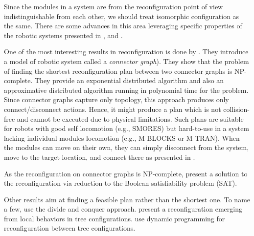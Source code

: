 Since the modules in a system are from the reconfiguration point of view
indistinguishable from each other, we should treat isomorphic configuration as
the same. There are some advances in this area leveraging specific properties of
the robotic systems presented in \textcite{DBLP:journals/ijrr/ParkCTY08},
\textcite{DBLP:conf/iros/AsadpourASI09} and
\textcite{DBLP:journals/ras/TaheriMAP16}.

One of the most interesting results in reconfiguration is done by
\textcite{DBLP:journals/ras/HouS14}. They introduce a model of robotic system
called a \emph{connector graph}). They show that the problem of finding the
shortest reconfiguration plan between two connector graphs is NP-complete. They
provide an exponential distributed algorithm and also an approximative
distributed algorithm running in polynomial time for the problem. Since
connector graphs capture only topology, this approach produces only
connect/disconnect actions. Hence, it might produce a plan which is not
collision-free and cannot be executed due to physical limitations. Such plans
are suitable for robots with good self locomotion (e.g., SMORES) but hard-to-use
in a system lacking individual modules locomotion (e.g., M-BLOCKS or M-TRAN).
When the modules can move on their own, they can simply disconnect from the
system, move to the target location, and connect there as presented in
\cite{DBLP:journals/ral/LiuWY19}.

As the reconfiguration on connector graphs is NP-complete,
\textcite{DBLP:journals/pcs/GorbenkoP12} present a solution to the
reconfiguration via reduction to the Boolean satisfiability problem (SAT).

Other results aim at finding a feasible plan rather than the shortest one. To
name a few, \textcite{10.1117/12.360345} use the divide and conquer approach.
\textcite{DBLP:conf/icra/HouS08} present a reconfiguration emerging from local
behaviors in tree configurations. \textcite{DBLP:journals/ral/LiuWY19} use
dynamic programming for reconfiguration between tree configurations.

